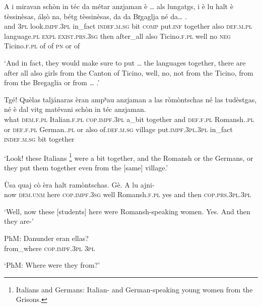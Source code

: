 \begin{linenumbers}
\gll    A i miravan schòn in téc da métar anzjaman è … als lungatgs, i è lu halt è tèssinèsas, álṣò na, bétg tèssinèsas, da da Br̩gaglja\footnotemark{} né da… .\\
and \textsc{3pl} look.\textsc{impf.3pl} in\_fact \textsc{indef.m.sg} bit  \textsc{comp} put.\textsc{inf} together also {} \textsc{def.m.pl} language.\textsc{pl} \textsc{expl} \textsc{exist.prs.3sg} then after\_all also Ticino.\textsc{f.pl} well no \textsc{neg} Ticino.\textsc{f.pl} of of \textsc{pn} or of\\
\end{linenumbers}
\medskip
\glt `And in fact, they would make sure to put … the languages together, there are after all also girls from the Canton of Ticino, well, no, not from the Ticino, from from the Bregaglia or from … .'
\medskip

\begin{linenumbers}
\gll    Tgé! Quèlas taljánaras èran ampʰau anzjaman a las ròmòntschas né las tudèstgas, né è dal vitg matévani schòn in téc anzjaman.\\
what \textsc{dem.f.pl} Italian.\textsc{f.pl} \textsc{cop.impf.3pl} a\_bit together and \textsc{def.f.pl} Romansh.\textsc{.pl} or  \textsc{def.f.pl} German.\textsc{.pl} or also of.\textsc{def.m.sg} village put.\textsc{impf.3pl.3pl} in\_fact \textsc{indef.m.sg} bit together\\
\end{linenumbers}
\medskip
\glt `Look! these Italians \footnote{Italians and Germans: Italian- and German-speaking young women from the Grisons.} were a bit together, and the Romansh or the Germans, or they put them together even from the [same] village.'
\medskip

\begin{linenumbers}
\gll Ùsa quaj cò èra halt ramòntschas. Gè. A lu ajni-\\
now \textsc{dem.unm} here \textsc{cop.impf.3sg} well Romansh.\textsc{f.pl} yes and then \textsc{cop.prs.3pl.3pl}  \\
\end{linenumbers}
\medskip
\glt `Well, now these [students] here were Romansh-speaking women. Yes. And then they are-'
\medskip

\begin{linenumbers}
\gll    PhM: Danunder eran ellas?
\\
{} from\_where \textsc{cop.impf.3pl} \textsc{3pl} \\
\end{linenumbers}
\medskip
\glt `PhM: Where were they from?'
\medskip

